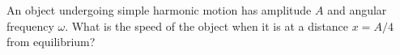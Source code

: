 An object undergoing simple harmonic motion has amplitude $A$ and angular frequency
$\omega$. What is the speed of the object when it is at a distance $x
= A/4$ from equilibrium?\answercheck
